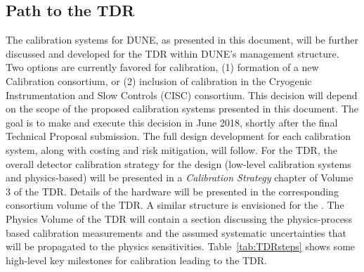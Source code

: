 \subsection{Path to the TDR}
\label{sec:TDR}
The calibration systems for DUNE, as presented in this document, will be further discussed and developed for the TDR within DUNE's management %
structure. Two options are currently favored for %
calibration, (1) formation of a new Calibration consortium, or (2) inclusion of calibration in the Cryogenic Instrumentation and Slow Controls (CISC) consortium. This decision will depend on the scope of the proposed calibration systems presented in this document. The goal is to make and execute this decision in June 2018, shortly after the final Technical Proposal submission. %
The full design development for each calibration system, along with costing and risk mitigation, will follow. %
For the TDR, the overall detector calibration strategy for the  design (low-level calibration systems and physics-based) will be presented in a \textit{Calibration Strategy} chapter of Volume 3 of the TDR. Details of the hardware will be presented in the corresponding consortium volume of the TDR. A similar structure is envisioned for the . %
The Physics Volume of the TDR will contain a section discussing the physics-process based calibration measurements and the assumed systematic uncertainties that will be propagated to the physics sensitivities. Table~\ref{tab:TDRsteps} shows some high-level key milestones for calibration leading to the TDR.

